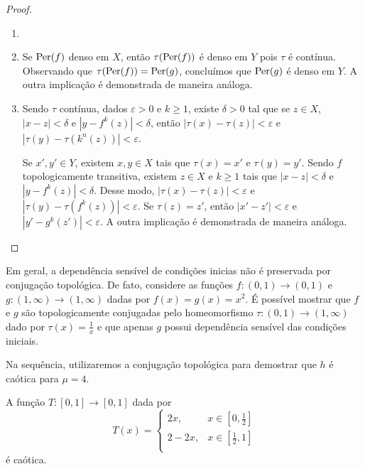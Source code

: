\begin{proof}
\begin{enumerate}\item[]
\item Se $\operatorname{Per}(f)$ denso em $X$, então $\tau(\operatorname{Per}(f))$ é denso em $Y$ pois $\tau$ é contínua. Observando que $\tau(\operatorname{Per}(f)) = \operatorname{Per}(g)$, concluímos que $\operatorname{Per}(g)$ é denso em $Y$. A outra implicação é demonstrada de maneira análoga.
\item Sendo $\tau$ contínua, dados $\varepsilon > 0$ e $k \geq 1$, existe $\delta > 0$ tal que se $z \in X$, $|x - z| < \delta$ e $|y - f^k(z)| < \delta$, então $|\tau(x) - \tau(z)| < \varepsilon$ e $|\tau(y) - \tau(k^n(z))| < \varepsilon$.

Se $x', y' \in Y$, existem $x, y \in X$ tais que $\tau(x) = x'$ e $\tau(y) =  y'$. Sendo $f$ topologicamente transitiva, existem $z \in X$ e $k \geq 1$ tais que $|x - z| < \delta$ e $|y - f^k(z)| < \delta$. Desse modo, $|\tau(x) - \tau(z)| < \varepsilon$ e $|\tau(y) - \tau(f^k(z))| < \varepsilon$. Se $\tau(z) = z'$, então $|x' - z'| < \varepsilon$ e $|y' - g^k(z')| < \varepsilon$. A outra implicação é demonstrada de maneira análoga.
\end{enumerate}
\end{proof}

Em geral, a dependência sensível de condições inicias não é preservada por conjugação topológica. De fato, considere as funções $f: (0, 1) \to (0, 1)$ e $g: (1, \infty) \to (1, \infty)$ dadas por $f(x) = g(x) = x^2$. É possível mostrar que $f$ e $g$ são topologicamente conjugadas pelo homeomorfismo $\tau: (0, 1) \to (1, \infty)$ dado por $\tau(x) = \frac{1}{x}$ e que apenas $g$ possui dependência sensível das condições iniciais. 

Na sequência, utilizaremos a conjugação topológica para demostrar que $h$ é caótica para $\mu = 4$.

\begin{lemma}
A função $T: [0,1] \to [0,1]$ dada por
\[ T(x) =
  \begin{cases}
    2x, & x \in \left[ 0, \frac{1}{2} \right] \\
    2 - 2x, & x \in \left[ \frac{1}{2}, 1 \right] \\
  \end{cases}
\]
é caótica.
\end{lemma}

